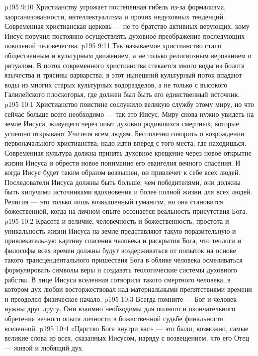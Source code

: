 \vs p195 9:10 Христианству угрожает постепенная гибель из\hyp{}за формализма, заорганизованности, интеллектуализма и прочих недуховных тенденций. Современная христианская церковь --- не то братство активных верующих, кому Иисус поручил постоянно осуществлять духовное преображение последующих поколений человечества.
\vs p195 9:11 Так называемое христианство стало общественным и культурным движением, а не только религиозным верованием и ритуалом. В поток современного христианства стекается много воды из болота язычества и трясины варварства; в этот нынешний культурный поток впадают воды из многих старых культурных водоразделов, а не только с высокого Галилейского плоскогорья, где должен был быть его единственный источник.
\vs p195 10:1 Христианство поистине сослужило великую службу этому миру, но что сейчас больше всего необходимо --- так это Иисус. Миру снова нужно увидеть на земле Иисуса, живущего через опыт духовно родившихся смертных, которые успешно открывают Учителя всем людям. Бесполезно говорить о возрождении первоначального христианства; надо идти вперед с того места, где находишься. Современная культура должна принять духовное крещение через новое открытие жизни Иисуса и обрести новое понимание его евангелия вечного спасения. И когда Иисус будет таким образом возвышен, он привлечет к себе всех людей. Последователи Иисуса должны быть больше, чем победителями, они должны быть кипучими источниками вдохновения и более полной жизни для всех людей. Религия --- это только лишь возвышенный гуманизм, но она становится божественной, когда на личном опыте осознается реальность присутствия Бога.
\vs p195 10:2 Красота и величие, человечность и божественность, простота и уникальность жизни Иисуса на земле представляют такую поразительную и привлекательную картину спасения человека и раскрытия Бога, что теологи и философы всех времен должны будут воздерживаться от попыток на основе такого трансцендентального пришествия Бога в облике человека осмеливаться формулировать символы веры и создавать теологические системы духовного рабства. В лице Иисуса вселенная сотворила такого смертного человека, в котором дух любви восторжествовал над материальными препятствиями времени и преодолел физическое начало.
\vs p195 10:3 \pc Всегда помните --- Бог и человек нужны друг другу. Они взаимно необходимы для полного и окончательного обретения вечного опыта личности в божественной судьбе финальности вселенной.
\vs p195 10:4 «Царство Бога внутри вас» --- это были, возможно, самые великие слова из всех, сказанных Иисусом, наряду с возвещением, что его Отец --- живой и любящий дух.
